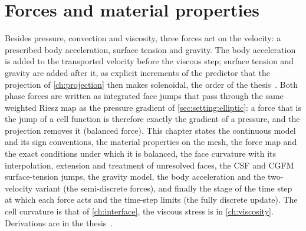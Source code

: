 \chapter{Forces and material properties}\label{ch:forces}
Besides pressure, convection and viscosity, three forces act on the
velocity: a prescribed body acceleration, surface tension and gravity. The
body acceleration is added to the transported velocity before the viscous
step; surface tension and gravity are added after it, as explicit
increments of the predictor that the projection of \cref{ch:projection} then
makes solenoidal, the order of the thesis~. Both
phase forces are written as integrated face jumps that pass through the same
weighted Riesz map as the pressure gradient of \cref{sec:setting:elliptic}:
a force that is the jump of a cell function is therefore exactly the
gradient of a pressure, and the projection removes it (balanced force). This
chapter states the continuous model and its sign conventions, the material
properties on the mesh, the force map and the exact conditions under which
it is balanced, the face curvature with its interpolation, extension and
treatment of unresolved faces, the CSF and CGFM surface-tension jumps, the
gravity model, the body acceleration and the two-velocity variant
(the semi-discrete forces), and finally the stage of the time step at which
each force acts and the time-step limits (the fully discrete update). The
cell curvature is that of \cref{ch:interface}, the viscous stress is in
\cref{ch:viscosity}. Derivations are in the thesis~.

